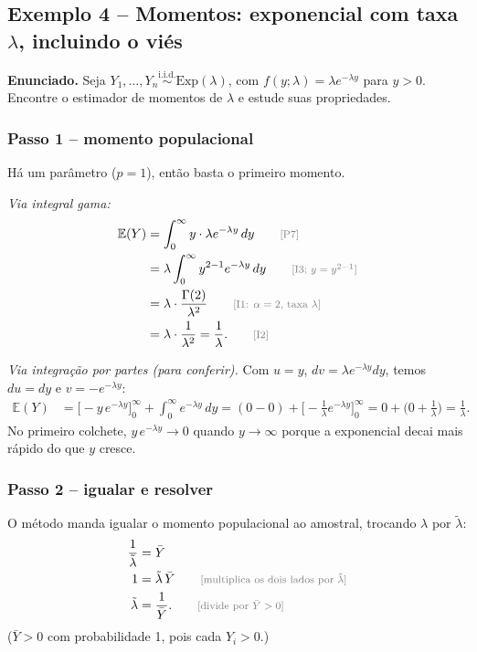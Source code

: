 \documentclass[11pt,a4paper]{article}
\theoremstyle{definition}
\theoremstyle{plain}
\newcommand{\E}{\mathbb{E}}
\newcommand{\iid}{\overset{\text{i.i.d.}}{\sim}}
\newcommand{\bY}{\bar{Y}}
\newcommand{\just}[1]{\tag*{\footnotesize\textcolor{gray}{[#1]}}}
\begin{document}
\subsection{Exemplo 4 -- Momentos: exponencial com taxa $\lambda$, incluindo o viés}\label{ex:mmexp}

\textbf{Enunciado.} Seja $Y_1,\dots,Y_n\iid\text{Exp}(\lambda)$, com $f(y;\lambda)=\lambda e^{-\lambda y}$ para $y>0$. Encontre o estimador de momentos de $\lambda$ e estude suas propriedades.

\subsubsection*{Passo 1 -- momento populacional}
Há um parâmetro ($p=1$), então basta o primeiro momento.

\textit{Via integral gama:}
\begin{align*}
\E(Y)&=\int_0^\infty y\cdot\lambda e^{-\lambda y}\,dy \just{P7}\\
&=\lambda\int_0^\infty y^{2-1}e^{-\lambda y}\,dy \just{I3; $y=y^{2-1}$}\\
&=\lambda\cdot\frac{\Gamma(2)}{\lambda^2} \just{I1: $\alpha=2$, taxa $\lambda$}\\
&=\lambda\cdot\frac{1}{\lambda^2}=\frac1\lambda . \just{I2}
\end{align*}

\textit{Via integração por partes (para conferir).} Com $u=y$, $dv=\lambda e^{-\lambda y}dy$, temos $du=dy$ e $v=-e^{-\lambda y}$:
\begin{align*}
\E(Y)&=\Big[-y\,e^{-\lambda y}\Big]_0^\infty+\int_0^\infty e^{-\lambda y}\,dy
=(0-0)+\Big[-\frac1\lambda e^{-\lambda y}\Big]_0^\infty
=0+\Big(0+\frac1\lambda\Big)=\frac1\lambda .
\end{align*}
No primeiro colchete, $y\,e^{-\lambda y}\to0$ quando $y\to\infty$ porque a exponencial decai mais rápido do que $y$ cresce.

\subsubsection*{Passo 2 -- igualar e resolver}
O método manda igualar o momento populacional ao amostral, trocando $\lambda$ por $\tilde\lambda$:
\begin{align*}
\frac{1}{\tilde\lambda}&=\bY\\
1&=\tilde\lambda\,\bY \just{multiplica os dois lados por $\tilde\lambda$}\\
\tilde\lambda&=\frac{1}{\bY}. \just{divide por $\bY>0$}
\end{align*}
($\bY>0$ com probabilidade 1, pois cada $Y_i>0$.)
\end{document}
